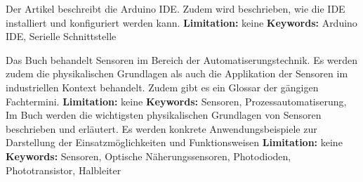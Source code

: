 { 
	Der Artikel \cite{Fezari:2018a} beschreibt die Arduino IDE. Zudem wird beschrieben, wie die IDE installiert und konfiguriert werden kann. 
	\textbf{Limitation:} keine 
	\scriptsize{\textbf{Keywords:}  Arduino IDE, Serielle Schnittstelle }
}  

{ 
	Das Buch \cite{Hesse:2009} behandelt Sensoren im Bereich der Automatiserungstechnik. Es werden zudem die physikalischen Grundlagen als auch die Applikation der Sensoren im industriellen Kontext behandelt. Zudem gibt es ein Glossar der gängigen Fachtermini. 
	\textbf{Limitation:} keine 
	\scriptsize{\textbf{Keywords:}  Sensoren, Prozessautomatiserung,  }
}  
{ 
	Im Buch \cite{Hering:2023a} werden die wichtigsten physikalischen Grundlagen von Sensoren beschrieben und erläutert. Es werden konkrete Anwendungsbeispiele zur Darstellung der Einsatzmöglichkeiten und Funktionsweisen
	\textbf{Limitation:} keine 
	\scriptsize{\textbf{Keywords:}  Sensoren, Optische Näherungssensoren, Photodioden, Phototransistor, Halbleiter}
}  

